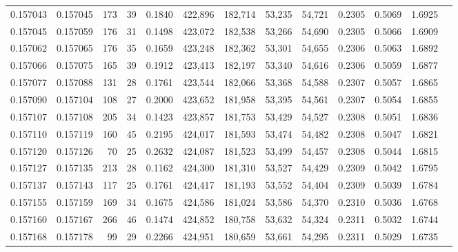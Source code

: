 \begin{tabular}{rrrrrrrrrrrrr}
0.157043 & 0.157045 &   173 &  39 &                                     0.1840 & 422,896 & 182,714 &  53,235 &  54,721 & 0.2305 & 0.5069 & 1.6925 \\
0.157045 & 0.157059 &   176 &  31 &                                     0.1498 & 423,072 & 182,538 &  53,266 &  54,690 & 0.2305 & 0.5066 & 1.6909 \\
0.157062 & 0.157065 &   176 &  35 &                                     0.1659 & 423,248 & 182,362 &  53,301 &  54,655 & 0.2306 & 0.5063 & 1.6892 \\
0.157066 & 0.157075 &   165 &  39 &                                     0.1912 & 423,413 & 182,197 &  53,340 &  54,616 & 0.2306 & 0.5059 & 1.6877 \\
0.157077 & 0.157088 &   131 &  28 &                                     0.1761 & 423,544 & 182,066 &  53,368 &  54,588 & 0.2307 & 0.5057 & 1.6865 \\
0.157090 & 0.157104 &   108 &  27 &                                     0.2000 & 423,652 & 181,958 &  53,395 &  54,561 & 0.2307 & 0.5054 & 1.6855 \\
0.157107 & 0.157108 &   205 &  34 &                                     0.1423 & 423,857 & 181,753 &  53,429 &  54,527 & 0.2308 & 0.5051 & 1.6836 \\
0.157110 & 0.157119 &   160 &  45 &                                     0.2195 & 424,017 & 181,593 &  53,474 &  54,482 & 0.2308 & 0.5047 & 1.6821 \\
0.157120 & 0.157126 &    70 &  25 &                                     0.2632 & 424,087 & 181,523 &  53,499 &  54,457 & 0.2308 & 0.5044 & 1.6815 \\
0.157127 & 0.157135 &   213 &  28 &                                     0.1162 & 424,300 & 181,310 &  53,527 &  54,429 & 0.2309 & 0.5042 & 1.6795 \\
0.157137 & 0.157143 &   117 &  25 &                                     0.1761 & 424,417 & 181,193 &  53,552 &  54,404 & 0.2309 & 0.5039 & 1.6784 \\
0.157155 & 0.157159 &   169 &  34 &                                     0.1675 & 424,586 & 181,024 &  53,586 &  54,370 & 0.2310 & 0.5036 & 1.6768 \\
0.157160 & 0.157167 &   266 &  46 &                                     0.1474 & 424,852 & 180,758 &  53,632 &  54,324 & 0.2311 & 0.5032 & 1.6744 \\
0.157168 & 0.157178 &    99 &  29 &                                     0.2266 & 424,951 & 180,659 &  53,661 &  54,295 & 0.2311 & 0.5029 & 1.6735 \\

\end{tabular}

